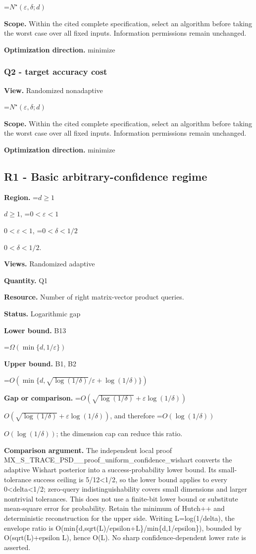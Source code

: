 \documentclass[10pt,a4paper]{article}
\newcommand{\AtlasMath}[1]{\par\begingroup\centering\setbox0=\hbox{$\displaystyle #1$}\ifdim\wd0>1.4\linewidth\typeout{ATLAS WIDE FORMULA: \the\wd0}\fi\ifdim\wd0>\linewidth\resizebox{\linewidth}{!}{\box0}\else\box0\fi\par\endgroup}
\newcommand{\AtlasInlineMath}[1]{\begingroup\setbox0=\hbox{$#1$}\ifdim\wd0>.4\linewidth\endgroup\AtlasMath{#1}\else\endgroup$#1$\fi}
\begin{document}
\AtlasMath{N^\star(\varepsilon,\delta;d)}
\textbf{Scope.} Within the cited complete specification, select an algorithm before taking the worst case over all fixed inputs. Information permissions remain unchanged.

\textbf{Optimization direction.} minimize

\subsubsection{Q2 - target accuracy cost}
\textbf{View.} Randomized nonadaptive

\AtlasMath{N^\star(\varepsilon,\delta;d)}
\textbf{Scope.} Within the cited complete specification, select an algorithm before taking the worst case over all fixed inputs. Information permissions remain unchanged.

\textbf{Optimization direction.} minimize

\subsection{R1 - Basic arbitrary-confidence regime}
\textbf{Region.} \AtlasInlineMath{d\ge1}, \AtlasInlineMath{0<\varepsilon<1}, \AtlasInlineMath{0<\delta<1/2}.

\textbf{Views.} Randomized adaptive

\textbf{Quantity.} Q1

\textbf{Resource.} Number of right matrix-vector product queries.

\textbf{Status.} Logarithmic gap

\textbf{Lower bound.} B13

\AtlasMath{\Omega(\min\{d,1/\varepsilon\})}
\textbf{Upper bound.} B1, B2

\AtlasMath{O(\min\{d,\sqrt{\log(1/\delta)}/\varepsilon+\log(1/\delta)\})}
\textbf{Gap or comparison.} \AtlasInlineMath{O(\sqrt{\log(1/\delta)}+\varepsilon\log(1/\delta))}, and therefore \AtlasInlineMath{O(\log(1/\delta))}; the dimension cap can reduce this ratio.

\textbf{Comparison argument.} The independent local proof MX\_\allowbreak{}S\_\allowbreak{}TRACE\_\allowbreak{}PSD\_\allowbreak{}\_\allowbreak{}proof\_\allowbreak{}uniform\_\allowbreak{}confidence\_\allowbreak{}wishart converts the adaptive Wishart posterior into a success-probability lower bound. Its small-tolerance success ceiling is 5/12<1/2, so the lower bound applies to every 0<delta<1/2; zero-query indistinguishability covers small dimensions and larger nontrivial tolerances. This does not use a finite-bit lower bound or substitute mean-square error for probability. Retain the minimum of Hutch++ and deterministic reconstruction for the upper side. Writing L=log(1/delta), the envelope ratio is O(min\{d,sqrt(L)/epsilon+L\}/min\{d,1/epsilon\}), bounded by O(sqrt(L)+epsilon L), hence O(L). No sharp confidence-dependent lower rate is asserted.
\end{document}
